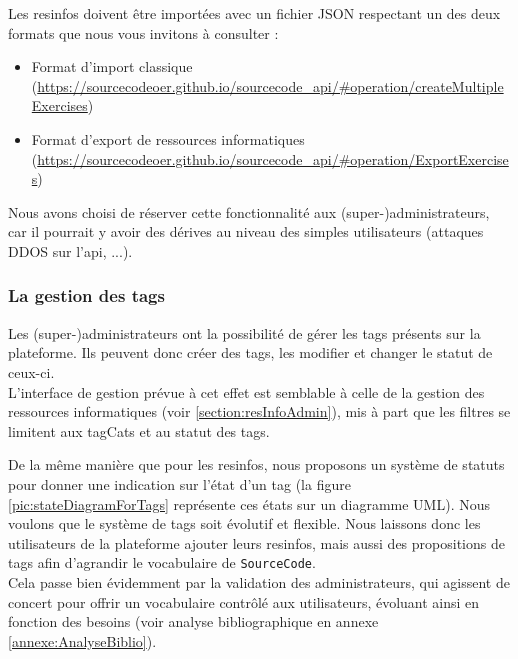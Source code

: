 Les \glspl{resinfo} doivent être importées avec un fichier JSON respectant un des deux formats que nous vous invitons à consulter :

\begin{itemize}
    \item Format d'import classique (\url{https://sourcecodeoer.github.io/sourcecode_api/#operation/createMultipleExercises})
    \item Format d'export de ressources informatiques (\url{https://sourcecodeoer.github.io/sourcecode_api/#operation/ExportExercises})
\end{itemize}

Nous avons choisi de réserver cette fonctionnalité aux (super-)administrateurs, car il pourrait y avoir des dérives au niveau des simples utilisateurs (attaques DDOS sur l'\gls{api}, ...).

\subsubsection{La gestion des \glspl{tag}}
\label{section:tagAdmin}

Les (super-)administrateurs ont la possibilité de gérer les \glspl{tag} présents sur la plateforme. Ils peuvent donc créer des \glspl{tag}, les modifier et changer le statut de ceux-ci.\\

L'interface de gestion prévue à cet effet est semblable à celle de la gestion des ressources informatiques (voir \ref{section:resInfoAdmin}), mis à part que les filtres se limitent aux \glspl{tagCat} et au statut des \glspl{tag}.


De la même manière que pour les \glspl{resinfo}, nous proposons un système de statuts pour donner une indication sur l'état d'un \gls{tag} (la figure \ref{pic:stateDiagramForTags} représente ces états sur un diagramme UML). Nous voulons que le système de \glspl{tag} soit évolutif et flexible. Nous laissons donc les utilisateurs de la plateforme ajouter leurs \glspl{resinfo}, mais aussi des propositions de \glspl{tag} afin d'agrandir le vocabulaire de \texttt{SourceCode}.\\

Cela passe bien évidemment par la validation des administrateurs, qui agissent de concert pour offrir un vocabulaire contrôlé aux utilisateurs, évoluant ainsi en fonction des besoins (voir analyse bibliographique en annexe \ref{annexe:AnalyseBiblio}).


